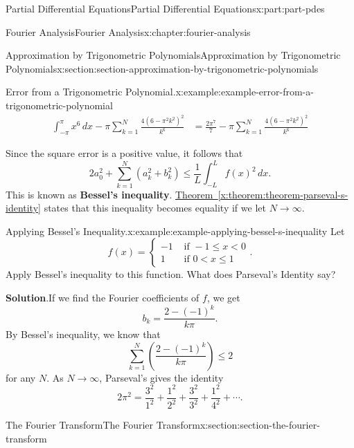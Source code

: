 \documentclass[oneside,10pt,]{book}
\newcommand{\blocktitlefont}{\relax}
\newcommand{\xreffont}{\relax}
\newcommand{\terminology}[1]{\textbf{#1}}
\numberwithin{equation}{part}
\newcommand{\amp}{&}
\begin{document}
\begin{partptx}{Partial Differential Equations}{}{Partial Differential Equations}{}{}{x:part:part-pdes}
\begin{chapterptx}{Fourier Analysis}{}{Fourier Analysis}{}{}{x:chapter:fourier-analysis}
\begin{sectionptx}{Approximation by Trigonometric Polynomials}{}{Approximation by Trigonometric Polynomials}{}{}{x:section:section-approximation-by-trigonometric-polynomials}
\begin{example}{Error from a Trigonometric Polynomial.}{x:example:example-error-from-a-trigonometric-polynomial}
\begin{align*}
\int_{-\pi}^{\pi}x^{6}\,dx - \pi\sum_{k=1}^{N}\frac{4(6 - \pi^{2}k^{2})^{2}}{k^{6}} \amp = \frac{2\pi^{7}}{7} - \pi\sum_{k=1}^{N}\frac{4(6 - \pi^{2}k^{2})^{2}}{k^{6}} 
\end{align*}
%
\end{example}
Since the square error is a positive value, it follows that%
\begin{equation*}
2a_{0}^{2} + \sum_{k=1}^{N}(a_{k}^{2} + b_{k}^{2}) \leq \frac{1}{L}\int_{-L}^{L}f(x)^{2}\,dx\text{.}
\end{equation*}
This is known as \terminology{Bessel's inequality}. \hyperref[x:theorem:theorem-parseval-s-identity]{Theorem~{\xreffont\ref{x:theorem:theorem-parseval-s-identity}}} states that this inequality becomes equality if we let \(N\to\infty\).%
\begin{example}{Applying Bessel's Inequality.}{x:example:example-applying-bessel-s-inequality}%
Let%
\begin{equation*}
f(x) = \begin{cases} -1 \amp\text{ if } -1\leq x < 0 \\ 1 \amp\text{ if } 0 < x \leq 1 \end{cases}\text{.}
\end{equation*}
Apply Bessel's inequality to this function. What does Parseval's Identity say?%
\par\smallskip%
\noindent\textbf{\blocktitlefont Solution}.\hypertarget{g:solution:idp105548780595488}{}\quad{}If we find the Fourier coefficients of \(f\), we get%
\begin{equation*}
b_{k} = \frac{2 - (-1)^{k}}{k\pi}\text{.}
\end{equation*}
By Bessel's inequality, we know that%
\begin{equation*}
\sum_{k=1}^{N}\left(\frac{2 - (-1)^{k}}{k\pi}\right) \leq 2
\end{equation*}
for any \(N\). As \(N\to\infty\), Parseval's gives the identity%
\begin{equation*}
2\pi^{2} = \frac{3^{2}}{1^{2}} + \frac{1^{2}}{2^{2}} + \frac{3^{2}}{3^{2}} + \frac{1^{2}}{4^{2}} + \cdots\text{.}
\end{equation*}
%
\end{example}
\end{sectionptx}
%
%
\typeout{************************************************}
\typeout{************************************************}
%
\begin{sectionptx}{The Fourier Transform}{}{The Fourier Transform}{}{}{x:section:section-the-fourier-transform}

\end{sectionptx}
\end{chapterptx}
\end{partptx}
\end{document}
